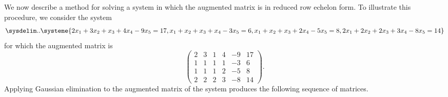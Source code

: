We now describe a method for solving a system in which the augmented matrix is in reduced row echelon form.
To illustrate this procedure, we consider the system
\[
    \sysdelim..\systeme{
        2 x_1 + 3 x_2 +   x_3 + 4 x_4 - 9 x_5 = 17,
          x_1 +   x_2 +   x_3 +   x_4 - 3 x_5 = 6,
          x_1 +   x_2 +   x_3 + 2 x_4 - 5 x_5 = 8,
        2 x_1 + 2 x_2 + 2 x_3 + 3 x_4 - 8 x_5 = 14
    }
\]
for which the augmented matrix is
\[
    \left(\begin{array}{rrrrr|r}
        2 & 3 & 1 & 4 & -9 & 17 \\
        1 & 1 & 1 & 1 & -3 & 6 \\
        1 & 1 & 1 & 2 & -5 & 8 \\
        2 & 2 & 2 & 3 & -8 & 14
    \end{array}\right).
\]
Applying Gaussian elimination to the augmented matrix of the system produces the following sequence of matrices.
